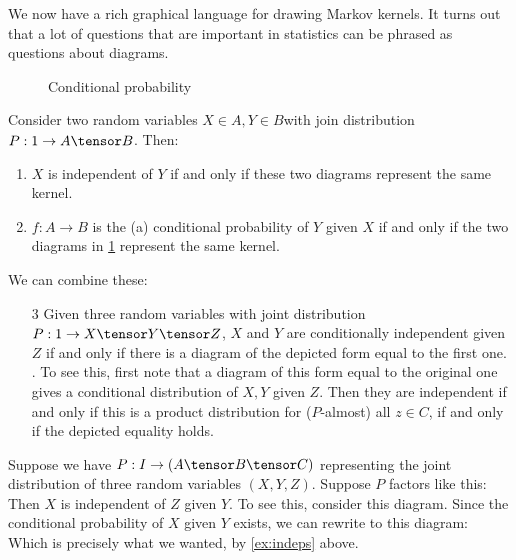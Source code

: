 \documentclass{article}
\begin{document}
We now have a rich graphical language for drawing Markov kernels.
It turns out that a lot of questions that are important in statistics can be phrased as questions about diagrams.
\begin{figure}
    \begin{center}
    
    \end{center}
    \caption{Conditional probability}
    
    \label{fig:conditional}
    \end{figure}    
\begin{example}
    Consider two random variables $X\in A,Y\in B$with join distribution $P: 1 \to A \tensor B$. Then:
    \begin{enumerate}
        \item $X$ is independent of $Y$ if and only if these two diagrams represent the same kernel.
        \item $f:A \to B$ is the (a) conditional probability of $Y$ given $X$ if and only if the two diagrams in \cref{fig:conditional} represent the same kernel.
    \end{enumerate}
    We can combine these:
    \begin{enumerate}
        \item[3] Given three random variables with joint distribution $P: 1 \to X \tensor Y \tensor Z$, $X$ and $Y$ are conditionally independent given $Z$ if and only if there is a diagram of the depicted form equal to the first one. .
        To see this, first note that a diagram of this form equal to the original one gives a conditional distribution of $X,Y$ given $Z$.
        Then they are independent if and only if this is a product distribution for ($P$-almost) all $z\in C$, if and only if the depicted equality holds.
    \end{enumerate}
\label{ex:indeps}
\end{example}
\begin{example}
    Suppose we have $P: I \to (A \tensor B \tensor C)$ representing the joint distribution of three random variables $(X,Y,Z)$.
    Suppose $P$ factors like this:
    Then $X$ is independent of $Z$ given $Y$.
    To see this, consider this diagram.
    Since the conditional probability of $X$ given $Y$ exists, we can rewrite to this diagram:
    Which is precisely what we wanted, by \cref{ex:indeps} above.
\end{example}
\end{document}
